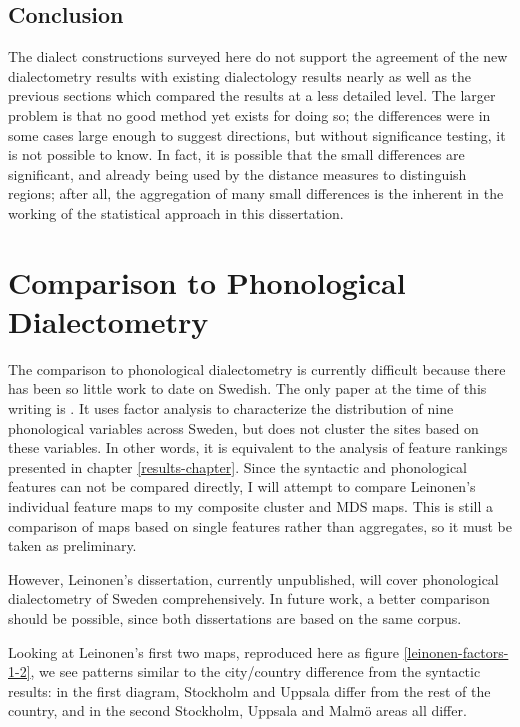 \subsection{Conclusion}

The dialect constructions surveyed here do not support the agreement
of the new dialectometry results with existing dialectology results
nearly as well as the previous sections which compared the results at
a less detailed level. The larger problem is that no good method yet
exists for doing so; the differences were in some cases large enough
to suggest directions, but without significance testing, it is not
possible to know. In fact, it is possible that the small differences
are significant, and already being used by the distance measures to
distinguish regions; after all, the aggregation of many small
differences is the inherent in the working of the statistical approach
in this dissertation.

\section{Comparison to Phonological Dialectometry}

The comparison to phonological dialectometry is currently difficult
because there has been so little work to date on Swedish. The only
paper at the time of this writing is . It uses
factor analysis to characterize the distribution of nine phonological
variables across Sweden, but does not cluster the sites based on these
variables. In other words, it is equivalent to the analysis of feature
rankings presented in chapter \ref{results-chapter}. Since the
syntactic and phonological features can not be compared directly, I will
attempt to compare Leinonen's individual feature maps to my composite
cluster and MDS maps. This is still a comparison of maps based on
single features rather than aggregates, so it must be taken as
preliminary.

However, Leinonen's dissertation, currently unpublished, will cover
phonological dialectometry of Sweden comprehensively. In future work,
a better comparison should be possible, since both dissertations are
based on the same corpus.

Looking at Leinonen's first two maps, reproduced here as figure
\ref{leinonen-factors-1-2}, we see patterns similar to the
city/country difference from the syntactic results: in the first diagram,
Stockholm and Uppsala differ from the rest of the country, and in the
second Stockholm, Uppsala and Malm\"o areas all differ.

